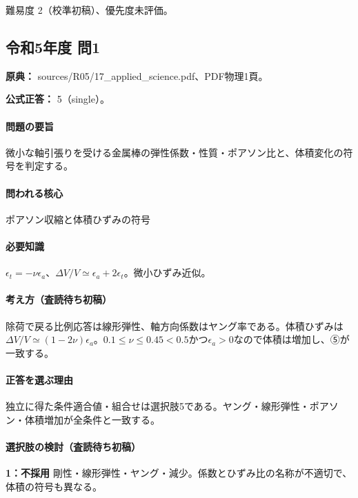\par 難易度 2（校準初稿）、優先度未評価。

\subsection{令和5年度 問1}
\label{q:r05-reg-applied-01}

\noindent\textbf{原典：} sources/R05/17\_applied\_science.pdf、PDF物理1頁。

\textbf{公式正答：} 5（single）。

\paragraph{問題の要旨} 微小な軸引張りを受ける金属棒の弾性係数・性質・ポアソン比と、体積変化の符号を判定する。

\paragraph{問われる核心} ポアソン収縮と体積ひずみの符号

\paragraph{必要知識} \(\epsilon_t=-\nu\epsilon_a\)、\(\Delta V/V\simeq\epsilon_a+2\epsilon_t\)。微小ひずみ近似。

\paragraph{考え方（査読待ち初稿）} 除荷で戻る比例応答は線形弾性、軸方向係数はヤング率である。体積ひずみは\(\Delta V/V\simeq(1-2\nu)\epsilon_a\)。\(0.1\le\nu\le0.45<0.5\)かつ\(\epsilon_a>0\)なので体積は増加し、⑤が一致する。

\paragraph{正答を選ぶ理由} 独立に得た条件適合値・組合せは選択肢5である。ヤング・線形弾性・ポアソン・体積増加が全条件と一致する。

\paragraph{選択肢の検討（査読待ち初稿）}\mbox{}\par

\noindent\textbf{1：不採用} 剛性・線形弾性・ヤング・減少。係数とひずみ比の名称が不適切で、体積の符号も異なる。\par

